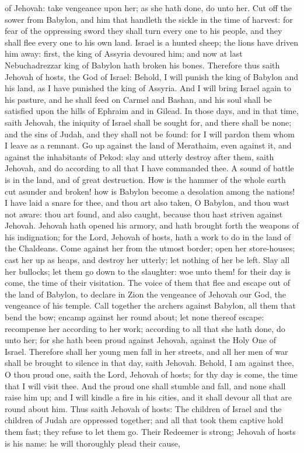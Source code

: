 of Jehovah: take vengeance upon her; as she hath done, do unto her. Cut off the sower from Babylon, and him that handleth the sickle in the time of harvest: for fear of the oppressing sword they shall turn every one to his people, and they shall flee every one to his own land.  Israel is a hunted sheep; the lions have driven him away: first, the king of Assyria devoured him; and now at last Nebuchadrezzar king of Babylon hath broken his bones. Therefore thus saith Jehovah of hosts, the God of Israel: Behold, I will punish the king of Babylon and his land, as I have punished the king of Assyria. And I will bring Israel again to his pasture, and he shall feed on Carmel and Bashan, and his soul shall be satisfied upon the hills of Ephraim and in Gilead. In those days, and in that time, saith Jehovah, the iniquity of Israel shall be sought for, and there shall be none; and the sins of Judah, and they shall not be found: for I will pardon them whom I leave as a remnant.  Go up against the land of Merathaim, even against it, and against the inhabitants of Pekod: slay and utterly destroy after them, saith Jehovah, and do according to all that I have commanded thee. A sound of battle is in the land, and of great destruction. How is the hammer of the whole earth cut asunder and broken! how is Babylon become a desolation among the nations! I have laid a snare for thee, and thou art also taken, O Babylon, and thou wast not aware: thou art found, and also caught, because thou hast striven against Jehovah. Jehovah hath opened his armory, and hath brought forth the weapons of his indignation; for the Lord, Jehovah of hosts, hath a work to do in the land of the Chaldeans. Come against her from the utmost border; open her store-houses; cast her up as heaps, and destroy her utterly; let nothing of her be left. Slay all her bullocks; let them go down to the slaughter: woe unto them! for their day is come, the time of their visitation. The voice of them that flee and escape out of the land of Babylon, to declare in Zion the vengeance of Jehovah our God, the vengeance of his temple.  Call together the archers against Babylon, all them that bend the bow; encamp against her round about; let none thereof escape: recompense her according to her work; according to all that she hath done, do unto her; for she hath been proud against Jehovah, against the Holy One of Israel. Therefore shall her young men fall in her streets, and all her men of war shall be brought to silence in that day, saith Jehovah. Behold, I am against thee, O thou proud one, saith the Lord, Jehovah of hosts; for thy day is come, the time that I will visit thee. And the proud one shall stumble and fall, and none shall raise him up; and I will kindle a fire in his cities, and it shall devour all that are round about him.  Thus saith Jehovah of hosts: The children of Israel and the children of Judah are oppressed together; and all that took them captive hold them fast; they refuse to let them go. Their Redeemer is strong; Jehovah of hosts is his name: he will thoroughly plead their cause, 
